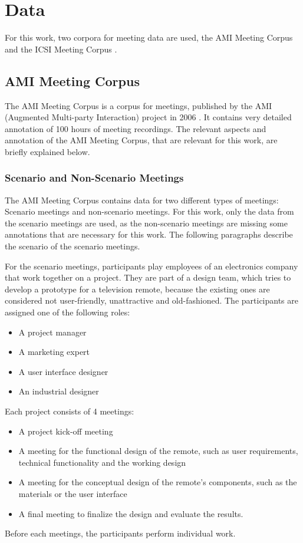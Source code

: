 \chapter{Data}\label{ch:data}

For this work, two corpora for meeting data are used, the AMI Meeting Corpus \cite{Mccowan05theami} and the ICSI Meeting Corpus \cite{Janin}.


\section{AMI Meeting Corpus}\label{sec:ami-meeting-corpus}

The AMI Meeting Corpus is a corpus for meetings, published by the AMI (Augmented Multi-party Interaction) project in 2006 \cite{Mccowan05theami}.
It contains very detailed annotation of 100 hours of meeting recordings.
The relevant aspects and annotation of the AMI Meeting Corpus, that are relevant for this work, are briefly explained below.

\subsection{Scenario and Non-Scenario Meetings}

The AMI Meeting Corpus contains data for two different types of meetings: Scenario meetings and non-scenario meetings.
For this work, only the data from the scenario meetings are used, as the non-scenario meetings are missing some annotations that are necessary for this work.
The following paragraphs describe the scenario of the scenario meetings.

For the scenario meetings, participants play employees of an electronics company that work together on a project.
They are part of a design team, which tries to develop a prototype for a television remote, because the existing ones are considered not user-friendly, unattractive and old-fashioned.
The participants are assigned one of the following roles:
\begin{itemize}
\item A project manager
\item A marketing expert
\item A user interface designer
\item An industrial designer
\end{itemize}

Each project consists of 4 meetings:
\begin{itemize}
\item A project kick-off meeting
\item A meeting for the functional design of the remote, such as user requirements, technical functionality and the working design
\item A meeting for the conceptual design of the remote's components, such as the materials or the user interface
\item A final meeting to finalize the design and evaluate the results.
\end{itemize}
Before each meetings, the participants perform individual work.

